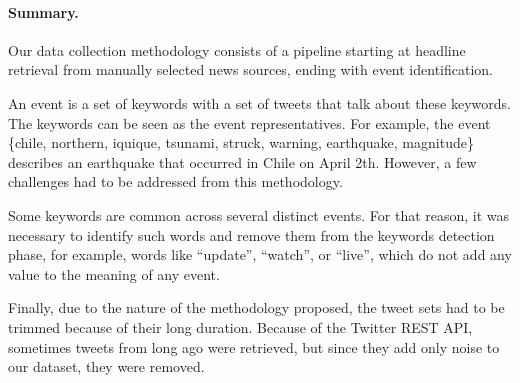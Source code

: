 \paragraph{Summary.}
%
Our data collection methodology consists of a pipeline starting at headline
retrieval from manually selected news sources, ending with event identification.

An event is a set of keywords with a set of tweets that talk about these
keywords.
%
The keywords can be seen as the event representatives. 
%
For example, the event \{chile, northern, iquique, tsunami, struck, warning,
earthquake, magnitude\} describes an earthquake that occurred in Chile on April
2th. 
%
However, a few challenges had to be addressed from this methodology.

Some keywords are common across several distinct events. 
%
For that reason, it was necessary to identify such words and remove them from
the keywords detection phase, for example, words like ``update'', ``watch'', or
``live'', which do not add any value to the meaning of any event. 

Finally, due to the nature of the methodology proposed, the tweet sets had to be
trimmed because of their long duration. 
%
Because of the Twitter REST API, sometimes tweets from long ago were retrieved,
but since they add only noise to our dataset, they were removed.

